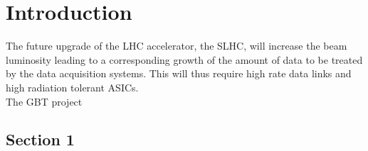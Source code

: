 \documentclass[main.tex]{subfiles}
\begin{document}
\chapter{Introduction}

The future upgrade of the LHC accelerator, the SLHC, will increase the beam luminosity leading to a corresponding growth of the amount of data to be treated by the data acquisition systems. This will thus require high rate data links and high radiation tolerant ASICs.\\
The GBT project



\section{Section 1}
\end{document}
